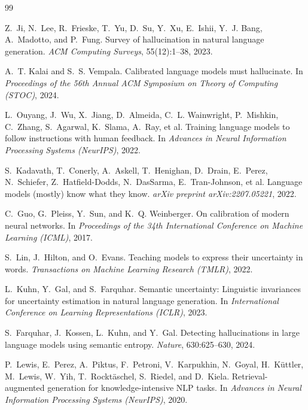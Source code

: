 \documentclass[11pt]{article}
\begin{document}
\begin{thebibliography}{99}

Z.~Ji, N.~Lee, R.~Frieske, T.~Yu, D.~Su, Y.~Xu, E.~Ishii, Y.~J. Bang,
A.~Madotto, and P.~Fung.
\newblock Survey of hallucination in natural language generation.
\newblock \emph{ACM Computing Surveys}, 55(12):1--38, 2023.

A.~T. Kalai and S.~S. Vempala.
\newblock Calibrated language models must hallucinate.
\newblock In \emph{Proceedings of the 56th Annual ACM Symposium on Theory of
Computing (STOC)}, 2024.

L.~Ouyang, J.~Wu, X.~Jiang, D.~Almeida, C.~L. Wainwright, P.~Mishkin, C.~Zhang,
S.~Agarwal, K.~Slama, A.~Ray, et al.
\newblock Training language models to follow instructions with human feedback.
\newblock In \emph{Advances in Neural Information Processing Systems (NeurIPS)},
2022.

S.~Kadavath, T.~Conerly, A.~Askell, T.~Henighan, D.~Drain, E.~Perez,
N.~Schiefer, Z.~Hatfield-Dodds, N.~DasSarma, E.~Tran-Johnson, et al.
\newblock Language models (mostly) know what they know.
\newblock \emph{arXiv preprint arXiv:2207.05221}, 2022.

C.~Guo, G.~Pleiss, Y.~Sun, and K.~Q. Weinberger.
\newblock On calibration of modern neural networks.
\newblock In \emph{Proceedings of the 34th International Conference on Machine
Learning (ICML)}, 2017.

S.~Lin, J.~Hilton, and O.~Evans.
\newblock Teaching models to express their uncertainty in words.
\newblock \emph{Transactions on Machine Learning Research (TMLR)}, 2022.

L.~Kuhn, Y.~Gal, and S.~Farquhar.
\newblock Semantic uncertainty: Linguistic invariances for uncertainty
estimation in natural language generation.
\newblock In \emph{International Conference on Learning Representations (ICLR)},
2023.

S.~Farquhar, J.~Kossen, L.~Kuhn, and Y.~Gal.
\newblock Detecting hallucinations in large language models using semantic
entropy.
\newblock \emph{Nature}, 630:625--630, 2024.

P.~Lewis, E.~Perez, A.~Piktus, F.~Petroni, V.~Karpukhin, N.~Goyal,
H.~K\"uttler, M.~Lewis, W.~Yih, T.~Rockt\"aschel, S.~Riedel, and D.~Kiela.
\newblock Retrieval-augmented generation for knowledge-intensive NLP tasks.
\newblock In \emph{Advances in Neural Information Processing Systems (NeurIPS)},
2020.

\end{thebibliography}
\end{document}

